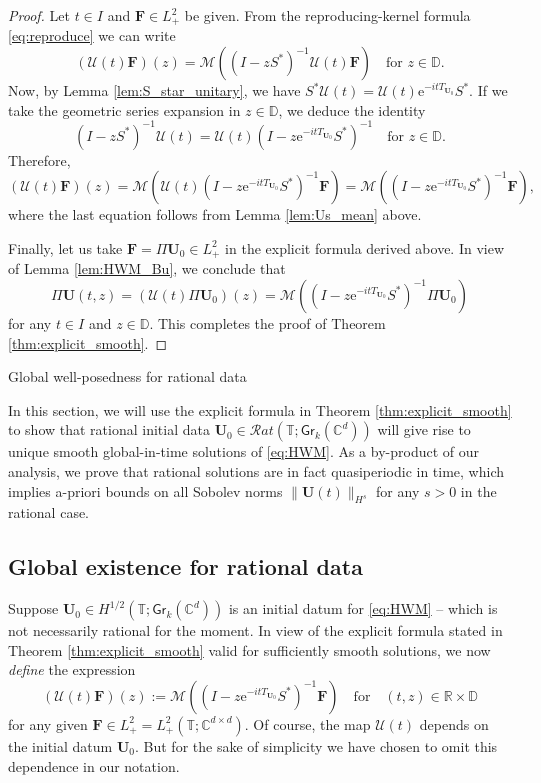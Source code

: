 \documentclass[10pt,reqno,a4paper]{amsart}
\makeatletter
\theoremstyle{definition}
\theoremstyle{remark}
\theoremstyle{remark}
\numberwithin{equation}{section}
\newcommand{\C}{\mathbb{C}}
\newcommand{\R}{\mathbb{R}}
\newcommand{\T}{\mathbb{T}}
\newcommand{\D}{\mathbb{D}}
\newcommand{\Mean}{\mathscr{M}}
\newcommand{\be}{\begin{equation}}
\newcommand{\ee}{\end{equation}}
\newcommand{\eu}{\mathrm{e}}
\newcommand{\Ub}{\mathbf{U}}
\newcommand{\Fb}{\mathbf{F}}
\newcommand{\id}{I}
\newcommand{\Gr}{\mathsf{Gr}}
\newcommand{\Us}{\mathscr{U}}
\def\section{\@startsection{section}{1}%
  \z@{1.5\linespacing\@plus\linespacing}{.5\linespacing}%
  {\normalfont\bfseries\large\centering}}
\makeatother
\begin{document}
\begin{proof}
Let $t \in I$ and $\Fb \in L^2_+$ be given. From the reproducing-kernel formula \eqref{eq:reproduce} we can write
$$
(\Us(t) \Fb)(z) = \Mean \left ( (\id - z S^*)^{-1} \Us(t) \Fb \right) \quad \mbox{for $z \in \D$}.
$$
Now, by Lemma \ref{lem:S_star_unitary}, we have $S^* \Us(t) = \Us(t) \eu^{-itT_{\Ub_0}} S^*$. If we take the geometric series expansion in $z \in \D$, we deduce the identity
$$
(\id-z S^*)^{-1} \Us(t) =  \Us(t) (\id-z \eu^{-it T_{\Ub_0}} S^*)^{-1} \quad \mbox{for $z \in \D$}.
$$
Therefore,
$$
(\Us(t) \Fb)(z) = \Mean \left ( \Us(t) (\id-z \eu^{-it T_{\Ub_0}} S^*)^{-1} \Fb \right ) = \Mean \left ( (\id-z \eu^{-it T_{\Ub_0}} S^*)^{-1} \Fb \right ),
$$
where the last equation follows from Lemma \ref{lem:Us_mean} above. 

Finally, let us take $\Fb = \Pi \Ub_0 \in L^2_+$ in the explicit formula derived above. In view of Lemma \ref{lem:HWM_Bu}, we conclude that
$$
\Pi \Ub(t,z) = (\Us(t) \Pi \Ub_0)(z) = \Mean \left ( ( \id - z \eu^{-it T_{\Ub_0}} S^*)^{-1} \Pi \Ub_0 \right ) 
$$ 
for any $t \in I$ and $z \in \D$. This completes the proof of Theorem \ref{thm:explicit_smooth}.
\end{proof}




\section{Global well-posedness for rational data}

\label{sec:rational}

In this section, we will use the explicit formula in Theorem \ref{thm:explicit_smooth} to show that rational initial data $\Ub_0 \in \mathcal{R}at(\T; \Gr_k(\C^d))$ will give rise to unique smooth global-in-time solutions of \eqref{eq:HWM}. As a by-product of our analysis, we prove that rational solutions are in fact quasiperiodic in time, which implies a-priori bounds on all Sobolev norms $\| \Ub(t) \|_{H^s}$ for any $s  >0$ in the rational case.


\subsection{Global existence for rational data}
Suppose  $\Ub_0 \in H^{1/2}(\T; \Gr_k(\C^d))$ is an initial datum for \eqref{eq:HWM} -- which is not necessarily rational for the moment. In view of the explicit formula stated in Theorem \ref{thm:explicit_smooth} valid for sufficiently smooth solutions, we now {\em define} the expression
\be \label{def:Us}
(\Us(t) \Fb)(z) := \Mean \left ( (\id-z \eu^{-it T_{\Ub_0}} S^*)^{-1} \Fb \right ) \quad \mbox{for} \quad (t,z)  \in \R \times \D
\ee
for any given $\Fb \in L^2_+=L^2_+(\T; \C^{d \times d})$. Of course, the map $\Us(t)$ depends on the initial datum $\Ub_0$. But for the sake of simplicity we have chosen to omit this dependence in our notation.
\end{document}
